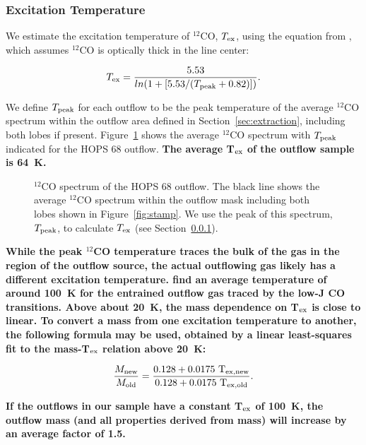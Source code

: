 \documentclass[twocolumn]{aastex63}
\newcommand{\example}{HOPS 68}
\newcommand{\tex}{$T_{\rm ex}$}
\newcommand{\co}[1][]{\ensuremath{^{#1}}CO}
\begin{document}
\subsubsection{Excitation Temperature}\label{sec:tex}
We estimate the excitation temperature of $^{12}$CO, \tex, using the equation from \citet{Rohlfs96}, which assumes $^{12}$CO is optically thick in the line center:

\begin{equation}\label{eq:Tex}
T_{\rm ex} = \frac{5.53}{ln(1 + [5.53/(T_{\rm peak} + 0.82)])}.
\end{equation}

We define $T_{\rm peak}$ for each outflow to be the peak temperature of the average $^{12}$CO spectrum within the outflow area defined in Section~\ref{sec:extraction}, including both lobes if present. Figure~\ref{fig:tex} shows the average $^{12}$CO spectrum with $T_{\rm peak}$ indicated for the \example{} outflow. \textbf{The average T$_{\rm ex}$ of the outflow sample is 64~K.}

\begin{figure}
\caption{\co[12]{} spectrum of the \example{} outflow. The black line shows the average \co[12]{} spectrum within the outflow mask including both lobes shown in Figure~\ref{fig:stamp}. We use the peak of this spectrum, $T_{\rm peak}$, to calculate \tex{} (see Section~\ref{sec:tex}). \label{fig:tex}}
\end{figure}

\textbf{While the peak $^{12}$CO temperature traces the bulk of the gas in the region of the outflow source, the actual outflowing gas likely has a different excitation temperature. \citet{Yang18} find an average temperature of around 100~K for the entrained outflow gas traced by the low-J CO transitions. Above about 20~K, the mass dependence on T$_{\rm ex}$ is close to linear. To convert a mass from one excitation temperature to another, the following formula may be used, obtained by a linear least-squares fit to the mass-T$_{\rm ex}$ relation above 20~K:}

\begin{equation}\label{eq:massTex}
\frac{M_{\rm new}}{M_{\rm old}} = \frac{0.128 + 0.0175~\rm T_{ex, new}}{0.128 + 0.0175~\rm T_{ex, old}}.
\end{equation}

\textbf{If the outflows in our sample have a constant T$_{\rm ex}$ of 100~K, the outflow mass (and all properties derived from mass) will increase by an average factor of 1.5.}
\end{document}
